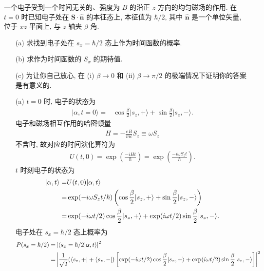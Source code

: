 \documentclass{assignment}
\begin{document}
\begin{prob}[课本习题 2.3]
    一个电子受到一个时间无关的、强度为 $B$ 的沿正 $z$ 方向的均匀磁场的作用. 在 $t=0$ 时已知电子处在 $\bm{S}\cdot\hat{\bm{n}}$ 的本征态上, 本征值为 $\hbar/2$, 其中 $\hat{\bm{n}}$ 是一个单位矢量, 位于 $xz$ 平面上, 与 $z$ 轴夹 $\beta$ 角.
    \begin{itemize}
        \item[(a)] 求找到电子处在 $s_x=\hbar/2$ 态上作为时间函数的概率.
        \item[(b)] 求作为时间函数的 $S_x$ 的期待值.
        \item[(c)] 为让你自己放心, 在 (i) $\beta\rightarrow 0$ 和 (ii) $\beta\rightarrow\pi/2$ 的极端情况下证明你的答案是有意义的.
    \end{itemize}
\end{prob}
\begin{sol}
    \begin{itemize}
        \item[(a)] $t=0$ 时, 电子的状态为
        \begin{align}
            \lvert\alpha,t=0\rangle=&\cos\frac{\beta}{2}\lvert s_z,+\rangle+\sin\frac{\beta}{2}\lvert s_z,-\rangle.
        \end{align}
        电子和磁场相互作用的哈密顿量
        \begin{align}
            H=-\frac{eB}{mc}S_z\equiv\omega S_z
        \end{align}
        不含时, 故对应的时间演化算符为
        \begin{align}
            U(t,0)=\exp\left(\frac{-iHt}{\hbar}\right)=\exp\left(\frac{-i\omega S_zt}{\hbar}\right).
        \end{align}
        $t$ 时刻电子的状态为
        \begin{align}
            \notag\lvert\alpha,t\rangle=&U(t,0)\lvert\alpha,t\rangle\\
            \notag=&\exp(-i\omega S_zt/\hbar)\left(\cos\frac{\beta}{2}\lvert s_z,+\rangle+\sin\frac{\beta}{2}\lvert s_z,-\rangle\right)\\
            =&\exp(-i\omega t/2)\cos\frac{\beta}{2}\lvert s_z,+\rangle+\exp(i\omega t/2)\sin\frac{\beta}{2}\lvert s_z,-\rangle.
        \end{align}
        电子处在 $s_x=\hbar/2$ 态上概率为
        \begin{align}
            \notag P(s_x=\hbar/2)=&\abs{\langle s_x=\hbar/2\vert\alpha,t\rangle}^2\\
            \notag=&\abs{\frac{1}{\sqrt{2}}(\langle s_z,+\rvert+\langle s_z,-\rvert)\left[\exp(-i\omega t/2)\cos\frac{\beta}{2}\lvert s_z,+\rangle+\exp(i\omega t/2)\sin\frac{\beta}{2}\lvert s_z,-\rangle\right]}^2\\

\end{align}
\end{itemize}
\end{sol}
\end{document}
